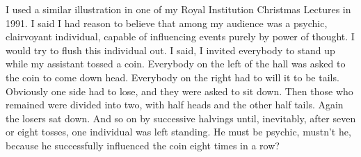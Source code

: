 I used a similar illustration in one of my Royal
Institution Christmas Lectures in 1991. I said I had reason
to believe that among my audience was a psychic,
clairvoyant individual, capable of influencing events
purely by power of thought. I would try to flush this
individual out.  I said,
 I invited everybody to
stand up while my assistant tossed a coin. Everybody on the
left of the hall was asked to  the coin to
come down head. Everybody on the right had to will it to be
tails. Obviously one side had to lose, and they were asked
to sit down. Then those who remained were divided into two,
with half  heads and the other half tails.
Again the losers sat down. And so on by successive halvings
until, inevitably, after seven or eight tosses, one
individual was left standing.  He must be psychic, mustn't he,
because he successfully influenced the coin eight times in
a row?